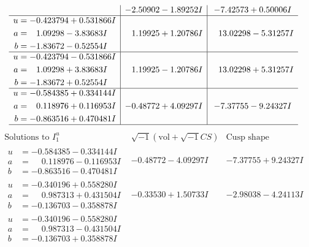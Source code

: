 \documentclass[1p]{elsarticle_modified}
\theoremstyle{definition}
\newcommand{\I}{\sqrt{-1}}
\begin{document}
$$\begin{array}{c|c|c}
 & -2.50902 - 1.89252 I & -7.42573 + 0.50006 I \\ \hline\begin{aligned}
u &= -0.423794 + 0.531866 I \\
a &= \phantom{-}1.09298 - 3.83683 I \\
b &= -1.83672 - 0.52554 I\end{aligned}
 & \phantom{-}1.19925 + 1.20786 I & \phantom{-}13.02298 - 5.31257 I \\ \hline\begin{aligned}
u &= -0.423794 - 0.531866 I \\
a &= \phantom{-}1.09298 + 3.83683 I \\
b &= -1.83672 + 0.52554 I\end{aligned}
 & \phantom{-}1.19925 - 1.20786 I & \phantom{-}13.02298 + 5.31257 I \\ \hline\begin{aligned}
u &= -0.584385 + 0.334144 I \\
a &= \phantom{-}0.118976 + 0.116953 I \\
b &= -0.863516 + 0.470481 I\end{aligned}
 & -0.48772 + 4.09297 I & -7.37755 - 9.24327 I\\
 \hline 
 \end{array}$$\newpage$$\begin{array}{c|c|c}  
\text{Solutions to }I^u_{1}& \I (\text{vol} + \sqrt{-1}CS) & \text{Cusp shape}\\
 \hline 
\begin{aligned}
u &= -0.584385 - 0.334144 I \\
a &= \phantom{-}0.118976 - 0.116953 I \\
b &= -0.863516 - 0.470481 I\end{aligned}
 & -0.48772 - 4.09297 I & -7.37755 + 9.24327 I \\ \hline\begin{aligned}
u &= -0.340196 + 0.558280 I \\
a &= \phantom{-}0.987313 + 0.431504 I \\
b &= -0.136703 - 0.358878 I\end{aligned}
 & -0.33530 + 1.50733 I & -2.98038 - 4.24113 I \\ \hline\begin{aligned}
u &= -0.340196 - 0.558280 I \\
a &= \phantom{-}0.987313 - 0.431504 I \\
b &= -0.136703 + 0.358878 I\end{aligned}

\end{array}$$
\end{document}
